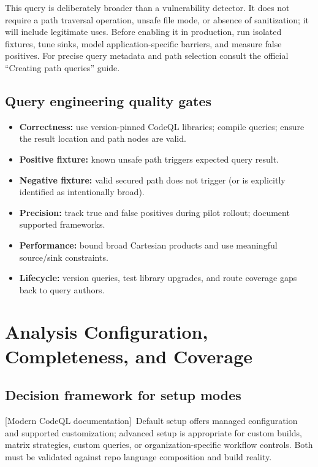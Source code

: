 \documentclass[11pt,letterpaper,oneside]{book}
\newcommand{\srcM}{\textsf{[Modern CodeQL documentation]}}
\begin{document}
This query is deliberately broader than a vulnerability detector. It does not require a path traversal operation, unsafe file mode, or absence of sanitization; it will include legitimate uses. Before enabling it in production, run isolated fixtures, tune sinks, model application-specific barriers, and measure false positives. For precise query metadata and path selection consult the official ``Creating path queries'' guide.

\section{Query engineering quality gates}

\begin{itemize}
\item \textbf{Correctness:} use version-pinned CodeQL libraries; compile queries; ensure the result location and path nodes are valid.
\item \textbf{Positive fixture:} known unsafe path triggers expected query result.
\item \textbf{Negative fixture:} valid secured path does not trigger (or is explicitly identified as intentionally broad).
\item \textbf{Precision:} track true and false positives during pilot rollout; document supported frameworks.
\item \textbf{Performance:} bound broad Cartesian products and use meaningful source/sink constraints.
\item \textbf{Lifecycle:} version queries, test library upgrades, and route coverage gaps back to query authors.
\end{itemize}

\chapter{Analysis Configuration, Completeness, and Coverage}

\section{Decision framework for setup modes}

\srcM\ Default setup offers managed configuration and supported customization; advanced setup is appropriate for custom builds, matrix strategies, custom queries, or organization-specific workflow controls. Both must be validated against repo language composition and build reality.
\end{document}

